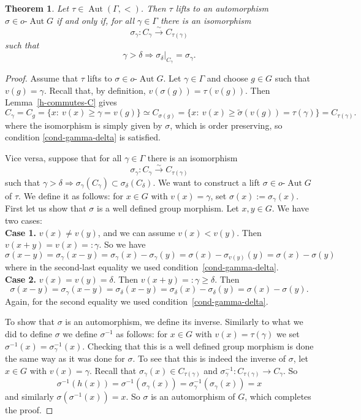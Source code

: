 \documentclass[12pt,a4paper,reqno,openright]{amsart}
\newcommand{\ra}{\rightarrow}
\newcommand{\lra}{\longrightarrow}
\renewcommand{\1}{\mathbbm{1}}
\newcommand{\G}{\Gamma}
\DeclareMathOperator{\Aut}{Aut}
\newcommand{\oAut}{o\text{-}\Aut}
\theoremstyle{definition}
\theoremstyle{plain}
\theoremstyle{plain}
\theoremstyle{plain}
\theoremstyle{plain}
\theoremstyle{plain}
\newtheorem{theorem}[defn]{Theorem}
\theoremstyle{plain}
\theoremstyle{plain}
\theoremstyle{plain}
\theoremstyle{definition}
\theoremstyle{definition}
\theoremstyle{plain}
\theoremstyle{definition}
\theoremstyle{definition}
\theoremstyle{plain}
\theoremstyle{plain}
\theoremstyle{plain}
\begin{document}
\begin{theorem}
	\label{lifting-principal-convex-sbgps}
	Let $\tau\in\Aut(\G, <)$. Then $\tau$ lifts to an automorphism
	$\sigma \in \oAut G$ if and only if, for all $\gamma\in\Gamma$ there is an isomorphism
	$$
	\sigma_\gamma\colon C_\gamma \overset{\sim}{\lra} C_{\tau(\gamma)}
	$$
	such that 
	\begin{equation}
	\label{cond-gamma-delta}
	\gamma>\delta \Rightarrow \sigma_\delta|_{C_\gamma}=\sigma_\gamma.
	\end{equation}
\end{theorem}
\begin{proof}
	Assume that $\tau$ lifts to $ \sigma\in\oAut G $. Let $\gamma\in\Gamma$ and choose $g\in G$ such that
	$v(g) = \gamma$. Recall that, by definition, $v(\sigma(g)) = \tau (v(g))$.
	Then Lemma~\ref{h-commutes-C} gives
	$$
	C_\gamma =C_g = \{x:\ v(x)\geq \gamma = v(g)\}\simeq C_{\sigma(g)} = \{x:\ v(x) \geq \tilde \sigma(v(g)) = \tau(\gamma)\} = C_{\tau(\gamma)}.
	$$
	where the isomorphism is simply given by $\sigma$, which is order preserving, so
	condition \eqref{cond-gamma-delta} is satisfied.
	
	Vice versa, suppose that for all $\gamma\in\Gamma$ there is an isomorphism
	$$
	\sigma_\gamma\colon C_\gamma \overset{\sim}{\lra} C_{\tau(\gamma)}
	$$
	such that $\gamma>\delta \Rightarrow \sigma_\gamma(C_\gamma)\subset \sigma_\delta(C_\delta)$.
	We want to construct a lift $\sigma \in \oAut G$ of $\tau$. We define it as follows:
	for $x\in G$ with $v(x) = \gamma$, set $\sigma(x):=\sigma_\gamma(x)$. First let us show that
	$\sigma$ is a well defined group morphism. Let $x,y \in G$. We have two cases:\\
	\textbf{Case 1.}
	$v(x)\neq v(y)$, and we can assume $v(x)<v(y)$.
	Then $v(x+y)=v(x) =:\gamma$. So we have 
	$$
	\sigma(x-y) = \sigma_\gamma (x-y) = \sigma_\gamma(x) - \sigma_\gamma(y) = \sigma(x) - \sigma_{v(y)}(y) = \sigma(x) - \sigma(y)$$
	where in the second-last equality we used condition~\eqref{cond-gamma-delta}.\\
	\textbf{Case 2.} $v(x) = v(y) = \delta$. Then $v(x+y) =: \gamma \geq \delta$. Then
	$$
	\sigma(x-y) = \sigma_\gamma(x-y) = \sigma_\delta(x-y) = \sigma_\delta(x) - \sigma_\delta(y) = \sigma(x) - \sigma(y).
	$$
	Again, for the second equality we used condition~\eqref{cond-gamma-delta}.
	
	To show that $\sigma$ is an automorphism, we define its inverse. Similarly to what we did
	to define $\sigma$ we define $\sigma^{-1}$ as follows: for $x\in G$ with 
	$v(x) = \tau(\gamma)$ we set $\sigma^{-1}(x) = \sigma_\gamma^{-1}(x) $.
	Checking that this is a
	well defined group morphism is done the same way as it was done for $\sigma$. To see that this is indeed the inverse of $ \sigma $, let $x\in G$ with 
	$v(x)=\gamma$.
	Recall that $\sigma_\gamma(x) \in C_{\tau(\gamma)}$ and $\sigma_\gamma^{-1}: C_{\tau(\gamma)}\ra C_\gamma$. So
	$$
	\sigma^{-1}(h(x)) = \sigma^{-1}(\sigma_\gamma(x)) = \sigma_\gamma^{-1}(\sigma_\gamma(x)) = x
	$$
	and similarly $\sigma(\sigma^{-1}(x)) = x$. So $\sigma$ is an automorphism of $G$, which completes the proof.
\end{proof}
\end{document}
